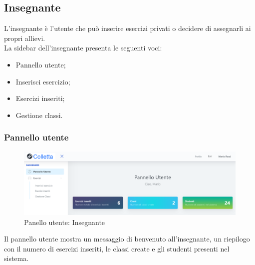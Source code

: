         
        
\newpage
    \subsection{Insegnante}
      L'insegnante è l'utente che può inserire esercizi privati o decidere di assegnarli ai propri allievi. 
         \\La sidebar dell'insegnante presenta le seguenti voci:
        	\begin{itemize}
            	\item Pannello utente;
            	\item Inserisci esercizio;
            	\item Esercizi inseriti;
            	\item Gestione classi.
        	\end{itemize}
        
        
        
        \subsubsection{Pannello utente}
        \begin{figure}[H]
        		\centering
        		\includegraphics[width=1\linewidth]{sez/img/insegnante/panelloUtente.PNG} 
        		\caption{Panello utente: Insegnante}\label{fig:1}
    		\end{figure}
          Il pannello utente mostra un messaggio di benvenuto all'insegnante, un riepilogo con il numero di esercizi inseriti, le classi create e gli studenti presenti nel sistema.
        
        \newpage
